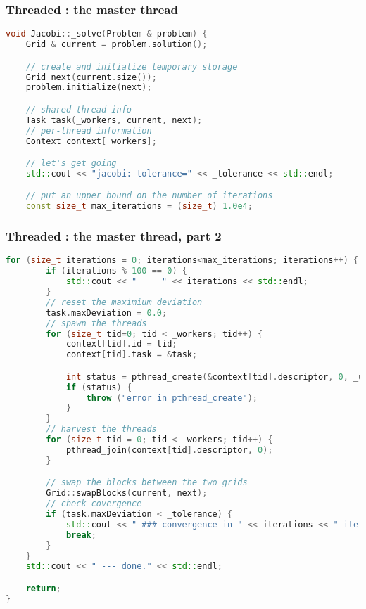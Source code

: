 \begin{frame}[fragile]
% 
  \frametitle{Threaded : the master thread}
%
  \begin{lstlisting}[language=c++,name=Jacobi:threaded]
void Jacobi::_solve(Problem & problem) {
    Grid & current = problem.solution();

    // create and initialize temporary storage
    Grid next(current.size());
    problem.initialize(next);

    // shared thread info
    Task task(_workers, current, next);
    // per-thread information
    Context context[_workers];

    // let's get going
    std::cout << "jacobi: tolerance=" << _tolerance << std::endl;

    // put an upper bound on the number of iterations
    const size_t max_iterations = (size_t) 1.0e4;
  \end{lstlisting}
%
\end{frame}

\begin{frame}[fragile]
% 
  \frametitle{Threaded : the master thread, part 2}
%
  \begin{lstlisting}[language=c++,name=Jacobi:threaded,basicstyle=\tt\bfseries\tiny]
    for (size_t iterations = 0; iterations<max_iterations; iterations++) {
        if (iterations % 100 == 0) {
            std::cout << "     " << iterations << std::endl;
        }
        // reset the maximium deviation
        task.maxDeviation = 0.0;
        // spawn the threads
        for (size_t tid=0; tid < _workers; tid++) {
            context[tid].id = tid;
            context[tid].task = &task;

            int status = pthread_create(&context[tid].descriptor, 0, _update, &context[tid]);
            if (status) {
                throw ("error in pthread_create");
            }
        }
        // harvest the threads
        for (size_t tid = 0; tid < _workers; tid++) {
            pthread_join(context[tid].descriptor, 0);
        }

        // swap the blocks between the two grids
        Grid::swapBlocks(current, next);
        // check covergence
        if (task.maxDeviation < _tolerance) {
            std::cout << " ### convergence in " << iterations << " iterations!" << std::endl;
            break;
        }
    }
    std::cout << " --- done." << std::endl;

    return;
}
  \end{lstlisting}
%
\end{frame}


